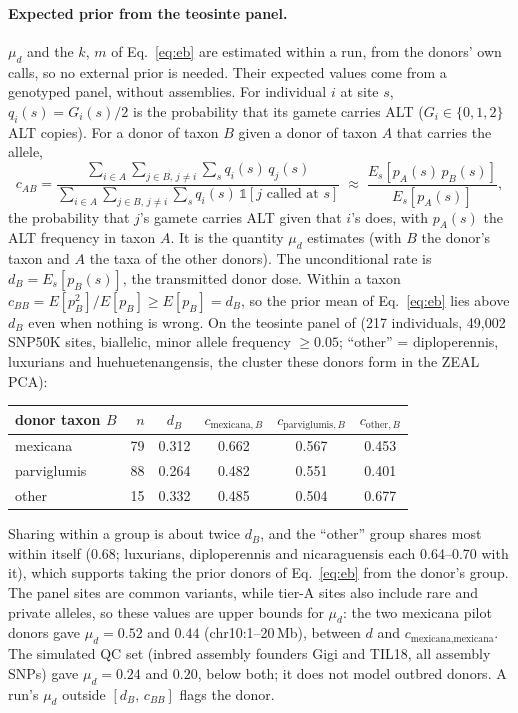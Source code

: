 \documentclass[11pt]{article}
\begin{document}
\paragraph{Expected prior from the teosinte panel.} $\mu_d$ and the $k$, $m$ of Eq.~\eqref{eq:eb} are estimated within a run, from the
donors' own calls, so no external prior is needed. Their expected values come from a genotyped panel, without assemblies. For
individual $i$ at site $s$, $q_i(s)=G_i(s)/2$ is the probability that its gamete carries ALT ($G_i\in\{0,1,2\}$ ALT copies). For a donor
of taxon $B$ given a donor of taxon $A$ that carries the allele,
\begin{equation}
c_{AB}=\frac{\sum_{i\in A}\sum_{j\in B,\,j\ne i}\sum_s q_i(s)\,q_j(s)}{\sum_{i\in A}\sum_{j\in B,\,j\ne i}\sum_s q_i(s)\,\mathbb{1}[j\text{ called at }s]}
\;\approx\;\frac{E_s[p_A(s)\,p_B(s)]}{E_s[p_A(s)]},
\label{eq:panelprior}
\end{equation}
the probability that $j$'s gamete carries ALT given that $i$'s does, with $p_A(s)$ the ALT frequency in taxon $A$. It is the quantity
$\mu_d$ estimates (with $B$ the donor's taxon and $A$ the taxa of the other donors). The unconditional rate is $d_B=E_s[p_B(s)]$, the
transmitted donor dose. Within a taxon $c_{BB}=E[p_B^2]/E[p_B]\ge E[p_B]=d_B$, so the prior mean of Eq.~\eqref{eq:eb} lies above
$d_B$ even when nothing is wrong. On the teosinte panel of \citet{grzybowski2023} (217 individuals, 49{,}002 SNP50K sites, biallelic,
minor allele frequency $\ge0.05$; ``other'' = diploperennis, luxurians and huehuetenangensis, the cluster these donors form in the
ZEAL PCA):
\begin{center}
\begin{tabular}{lrcccc}
\toprule
donor taxon $B$ & $n$ & $d_B$ & $c_{\text{mexicana},B}$ & $c_{\text{parviglumis},B}$ & $c_{\text{other},B}$\\
\midrule
mexicana & 79 & 0.312 & 0.662 & 0.567 & 0.453\\
parviglumis & 88 & 0.264 & 0.482 & 0.551 & 0.401\\
other & 15 & 0.332 & 0.485 & 0.504 & 0.677\\
\bottomrule
\end{tabular}
\end{center}
Sharing within a group is about twice $d_B$, and the ``other'' group shares most within itself (0.68; luxurians, diploperennis and
nicaraguensis each 0.64--0.70 with it), which supports taking the prior donors of Eq.~\eqref{eq:eb} from the donor's group. The panel
sites are common variants, while tier-A sites also include rare and private alleles, so these values are upper bounds for $\mu_d$: the
two mexicana pilot donors gave $\mu_d=0.52$ and $0.44$ (chr10:1--20\,Mb), between $d$ and $c_{\text{mexicana},\text{mexicana}}$. The
simulated QC set (inbred assembly founders Gigi and TIL18, all assembly SNPs) gave $\mu_d=0.24$ and $0.20$, below both; it does not
model outbred donors. A run's $\mu_d$ outside $[d_B,\,c_{BB}]$ flags the donor.
\end{document}
